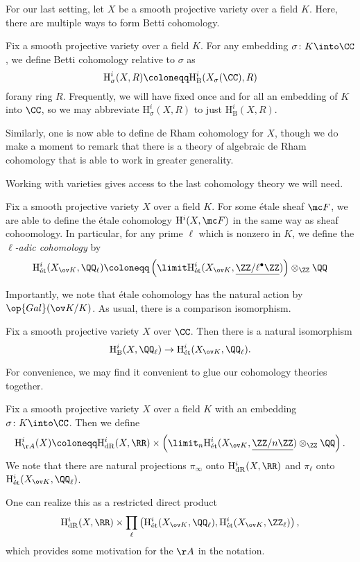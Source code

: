 \documentclass[../thesis.tex]{subfiles}
\begin{document}
For our last setting, let $X$ be a smooth projective variety over a field $K$. Here, there are multiple ways to form Betti cohomology.
\begin{notation}
	Fix a smooth projective variety over a field $K$. For any embedding $\sigma\colon K\into\CC$, we define Betti cohomology relative to $\sigma$ as
	\[\mathrm H^i_\sigma(X,R)\coloneqq\mathrm H^i_{\mathrm B}(X_\sigma(\CC),R)\]
	forany ring $R$. Frequently, we will have fixed once and for all an embedding of $K$ into $\CC$, so we may abbreviate $\mathrm H^i_\sigma(X,R)$ to just $\mathrm H^i_{\mathrm B}(X,R)$.
\end{notation}
Similarly, one is now able to define de Rham cohomology for $X$, though we do make a moment to remark that there is a theory of algebraic de Rham cohomology that is able to work in greater generality.

Working with varieties gives access to the last cohomology theory we will need.
\begin{defihelper} 
	Fix a smooth projective variety $X$ over a field $K$. For some \'etale sheaf $\mc F$, we are able to define the \'etale cohomology $\mathrm H^i(X,\mc F)$ in the same way as sheaf cohoomology. In particular, for any prime $\ell$ which is nonzero in $K$, we define the \textit{$\ell$-adic cohomology} by
	\[\mathrm H^i_{\mathrm{\acute et}}(X_{\ov K},\QQ_\ell)\coloneqq\left(\limit\mathrm H^i_{\mathrm{\acute et}}(X_{\ov K},\underline{\ZZ/\ell^\bullet\ZZ})\right)\otimes_\ZZ\QQ\]
\end{defihelper}
Importantly, we note that \'etale cohomology has the natural action by $\op{Gal}(\ov K/K)$. As usual, there is a comparison isomorphism.
\begin{theorem}
	Fix a smooth projective variety $X$ over $\CC$. Then there is a natural isomorphism
	\[\mathrm H^i_{\mathrm B}(X,\QQ_\ell)\to\mathrm H^i_{\mathrm{\acute et}}(X_{\ov K},\QQ_\ell).\]
\end{theorem}
For convenience, we may find it convenient to glue our cohomology theories together.
\begin{notation}
	Fix a smooth projective variety $X$ over a field $K$ with an embedding $\sigma\colon K\into\CC$. Then we define
	\[\mathrm H^i_{\AA}(X)\coloneqq\mathrm H^i_{\mathrm{dR}}(X,\RR)\times\left(\limit_n\mathrm H^i_{\mathrm{\acute et}}(X_{\ov K},\underline{\ZZ/n\ZZ})\otimes_\ZZ\QQ\right).\]
	We note that there are natural projections $\pi_\infty$ onto $\mathrm H^i_{\mathrm{dR}}(X,\RR)$ and $\pi_\ell$ onto $\mathrm H^i_{\mathrm{\acute et}}(X_{\ov K},\QQ_\ell)$.
\end{notation}
\begin{remark}
	One can realize this as a restricted direct product
	\[\mathrm H^i_{\mathrm{dR}}(X,\RR)\times\prod_\ell\left(\mathrm H^i_{\mathrm{\acute et}}(X_{\ov K},\QQ_\ell),\mathrm H^i_{\mathrm{\acute et}}(X_{\ov K},\ZZ_\ell)\right),\]
	which provides some motivation for the $\AA$ in the notation.
\end{remark}
\end{document}
